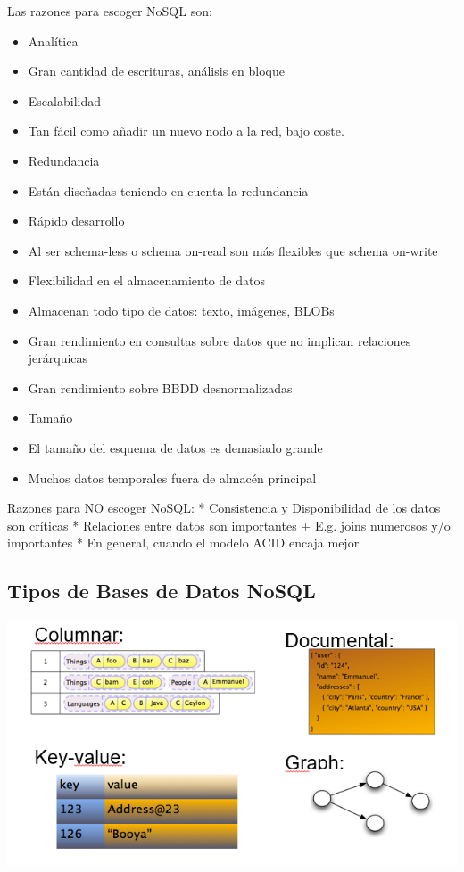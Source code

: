 \documentclass[]{book}
\providecommand{\tightlist}{%
  \setlength{\itemsep}{0pt}\setlength{\parskip}{0pt}}
\begin{document}
Las razones para escoger NoSQL son:

\begin{itemize}
\tightlist
\item
  Analítica
\item
  Gran cantidad de escrituras, análisis en bloque
\item
  Escalabilidad
\item
  Tan fácil como añadir un nuevo nodo a la red, bajo coste.
\item
  Redundancia
\item
  Están diseñadas teniendo en cuenta la redundancia
\item
  Rápido desarrollo
\item
  Al ser schema-less o schema on-read son más flexibles que schema on-write
\item
  Flexibilidad en el almacenamiento de datos
\item
  Almacenan todo tipo de datos: texto, imágenes, BLOBs
\item
  Gran rendimiento en consultas sobre datos que no implican relaciones jerárquicas
\item
  Gran rendimiento sobre BBDD desnormalizadas
\item
  Tamaño
\item
  El tamaño del esquema de datos es demasiado grande
\item
  Muchos datos temporales fuera de almacén principal
\end{itemize}

Razones para NO escoger NoSQL:
* Consistencia y Disponibilidad de los datos son críticas
* Relaciones entre datos son importantes
+ E.g. joins numerosos y/o importantes
* En general, cuando el modelo ACID encaja mejor

\hypertarget{tipos-de-bases-de-datos-nosql}{%
\subsection{Tipos de Bases de Datos NoSQL}\label{tipos-de-bases-de-datos-nosql}}

\includegraphics{images/TiposBBDDNoSQL.png}
\end{document}
